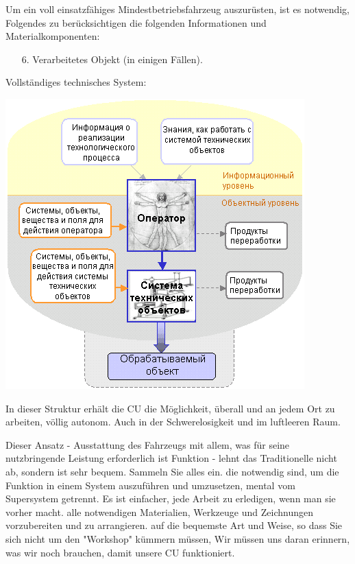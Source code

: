 \documentclass[11pt,a4paper]{article}
\begin{document}
{Um ein voll einsatzfähiges Mindestbetriebsfahrzeug auszurüsten, ist es notwendig, Folgendes zu berücksichtigen
die folgenden Informationen und Materialkomponenten:
\begin{itemize}
\Posten[1.] Technologischer Prozess der Ausführung einer nützlichen Funktion.
\Posten[2.] Materielle technische und natürliche Objekte und Systeme verschiedener Art
 die Ebene der Hierarchie.
\Posten[3.] Ein oder mehrere Operatoren mit einer Reihe von Empfängen
 materielle Objekt- und Systemverwaltung.
\Posten[4.] Stoffe und Felder, die zum Betrieb materieller Objekte erforderlich sind und
 Systeme und ihre Produkte.
\Position[5.] Stoffe und Felder, die für die Funktion des Operators erforderlich sind, und
 die Produkte ihrer Verarbeitung.
\item[6.] Verarbeitetes Objekt (in einigen Fällen).
\end{itemize}
Vollständiges technisches System:
\begin{center}
 \includegraphics[width=.8\textwidth]{mts-3.png}
\end{center}
In dieser Struktur erhält die CU die Möglichkeit, überall und an jedem Ort zu arbeiten,
völlig autonom. Auch in der Schwerelosigkeit und im luftleeren Raum.

Dieser Ansatz - Ausstattung des Fahrzeugs mit allem, was für seine nutzbringende Leistung erforderlich ist
Funktion - lehnt das Traditionelle nicht ab, sondern ist sehr bequem. Sammeln Sie alles ein.
die notwendig sind, um die Funktion in einem System auszuführen und umzusetzen,
mental vom Supersystem getrennt. Es ist einfacher, jede Arbeit zu erledigen, wenn man sie vorher macht.
alle notwendigen Materialien, Werkzeuge und Zeichnungen vorzubereiten und zu arrangieren.
auf die bequemste Art und Weise, so dass Sie sich nicht um den "Workshop" kümmern müssen,
Wir müssen uns daran erinnern, was wir noch brauchen, damit unsere CU funktioniert.

}
\end{document}
